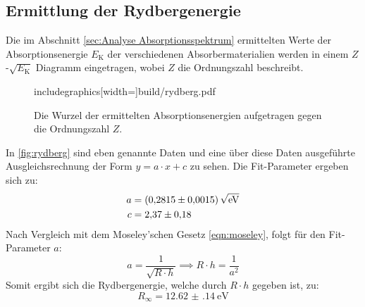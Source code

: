 \subsection{Ermittlung der Rydbergenergie}

Die im Abschnitt \ref{sec:Analyse Absorptionsspektrum} ermittelten Werte der Absorptionsenergie $E_{\text{K}}$ der verschiedenen Absorbermaterialien werden
in  einem $Z$-$\sqrt{E_{\text{K}}}$ Diagramm eingetragen, wobei $Z$ die Ordnungszahl beschreibt.

\begin{figure}
  \centering
  includegraphics[width=\textwidth]{build/rydberg.pdf}
  \caption{Die Wurzel der ermittelten Absorptionsenergien aufgetragen gegen die Ordnungszahl $Z$.}
  \label{fig:rydberg}
\end{figure}

\noindent
In \autoref{fig:rydberg} sind eben genannte Daten und eine über diese Daten ausgeführte Ausgleichsrechnung der Form $y = a \cdot x + c $ zu sehen.
Die Fit-Parameter ergeben sich zu:
\begin{align*}
  a &= \SI{0.2815 \pm 0.0015}{\per\sqrt{\electronvolt}}\\
  c &= \num{2.37 \pm 0.18}
\end{align*}
Nach Vergleich mit dem Moseley'schen Gesetz \eqref{eqn:moseley}, folgt für den Fit-Parameter $a$:
\begin{equation*}
  a = \frac{1}{\sqrt{R\cdot h}} \implies R \cdot h = \frac{1}{a^2}
\end{equation*}
Somit ergibt sich die Rydbergenergie, welche durch $R \cdot h $ gegeben ist, zu:
\begin{equation*}
  R_{\infty} = \SI{12.62(14)}{\electronvolt}
\end{equation*}